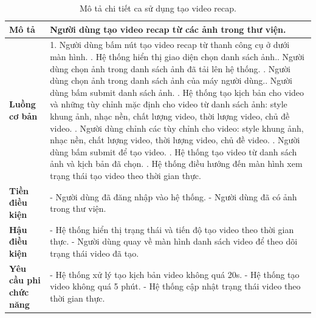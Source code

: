 \noindent 
\begin{table}[H]
\centering
\begin{tabularx}{\linewidth}{| l | X |} 
\hline 
\textbf{Mô tả} & Người dùng tạo video recap từ các ảnh trong thư viện. \\
\hline 
\textbf{Luồng cơ bản} & 1. Người dùng bấm nút tạo video recap từ thanh công cụ ở dưới màn hình. \newline
                       2. Hệ thống hiển thị giao diện chọn danh sách ảnh.\newline
                       3. Người dùng chọn ảnh trong danh sách ảnh đã tải lên hệ thống. \newline
                       4. Người dùng chọn ảnh trong danh sách ảnh của máy người dùng.\newline
                       5. Người dùng bấm submit danh sách ảnh. \newline
                       6. Hệ thống tạo kịch bản cho video và những tùy chỉnh mặc định cho video từ danh sách ảnh: style khung ảnh, nhạc nền, chất lượng video, thời lượng video, chủ đề video. \newline
                       7. Người dùng chỉnh các tùy chỉnh cho video: style khung ảnh, nhạc nền, chất lượng video, thời lượng video, chủ đề video. \newline
                       8. Người dùng bấm submit để tạo video. \newline
                       9. Hệ thống tạo video từ danh sách ảnh và kịch bản đã chọn. \newline
                       10. Hệ thống điều hướng đến màn hình xem trạng thái tạo video theo thời gian thực. \\
\hline 
\textbf{Tiền điều kiện} & - Người dùng đã đăng nhập vào hệ thống. \newline
                            - Người dùng đã có ảnh trong thư viện. \\
\hline
\textbf{Hậu điều kiện} & - Hệ thống hiển thị trạng thái và tiến độ tạo video theo thời gian thực. \newline
                         - Người dùng quay về màn hình danh sách video để theo dõi trạng thái video đã tạo. \\
\hline 
\textbf{Yêu cầu phi chức năng} & - Hệ thống xử lý tạo kịch bản video không quá 20s. \newline 
                                 - Hệ thống tạo video không quá 5 phút. \newline
                                 - Hệ thống cập nhật trạng thái video theo thời gian thực. \\
\hline 
\end{tabularx}
\caption{Mô tả chi tiết ca sử dụng tạo video recap.}
\label{tab:create-video-recap-usecase}
\end{table}

